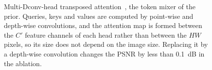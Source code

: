\begin{figure}[t]
{}
\caption{Multi-Dconv-head transposed attention~\cite{zamir2022restormer}, the token mixer of the prior. Queries, keys and values are computed by point-wise and depth-wise convolutions, and the attention map is formed between the $C'$ feature channels of each head rather than between the $HW$ pixels, so its size does not depend on the image size. Replacing it by a depth-wise convolution changes the PSNR by less than 0.1~dB in the ablation.}
\label{fig:mdta}
\end{figure}
